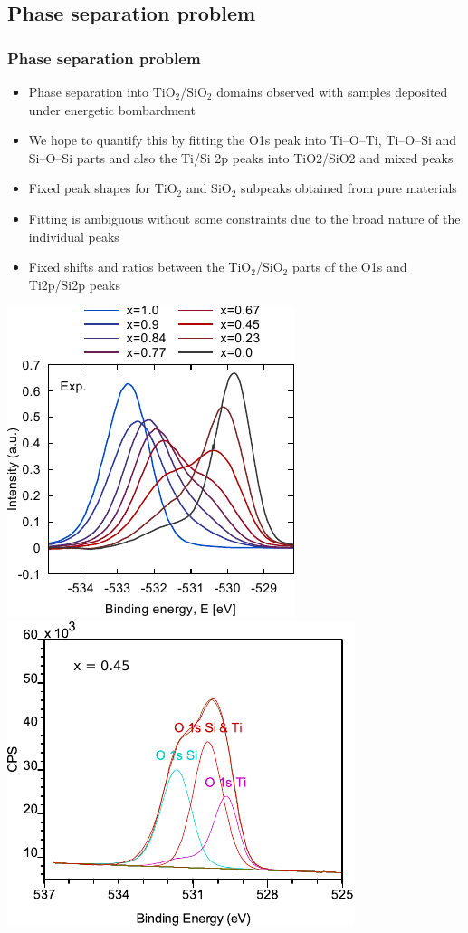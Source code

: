 \documentclass[noamsthm,8pt,t,xcolor={dvipsnames}]{beamer}
\begin{document}
\subsection{Phase separation problem}
\begin{frame}
   \frametitle{Phase separation problem}
   \vspace{-0.3cm}
   \begin{itemize}
      \item Phase separation into TiO$_2$/SiO$_2$ domains observed with samples deposited under energetic bombardment
      \item We hope to quantify this by fitting the O1s peak into Ti--O--Ti, Ti--O--Si and Si--O--Si parts and also the Ti/Si 2p peaks into TiO2/SiO2 and mixed peaks
      \item Fixed peak shapes for TiO$_2$ and SiO$_2$ subpeaks obtained from pure materials
      \item Fitting is ambiguous without some constraints due to the broad nature of the individual peaks
      \item Fixed shifts and ratios between the TiO$_2$/SiO$_2$ parts of the O1s and Ti2p/Si2p peaks
   \end{itemize}
   \begin{center}
      \includegraphics[width=0.35\linewidth]{figures/XPSexp.pdf}
      \hspace{0.2cm}\vspace{-1cm}   
      \includegraphics[width=0.37\linewidth]{figures/XPSfit.pdf}
   \end{center}

\end{frame}
\end{document}
